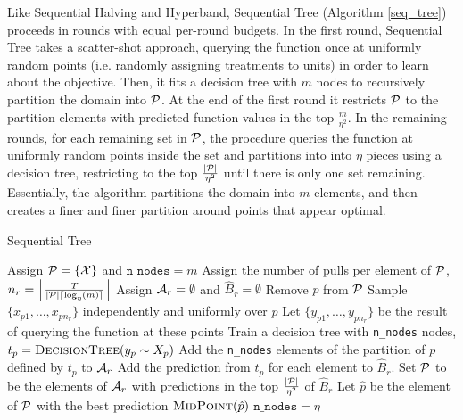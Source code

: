 \documentclass[11pt]{article}
\begin{document}
Like Sequential Halving and Hyperband, Sequential Tree (Algorithm \ref{seq_tree}) proceeds in rounds with equal per-round budgets. In the first round, Sequential Tree takes a scatter-shot approach, querying the function once at uniformly random points (i.e. randomly assigning treatments to units) in order to learn about the objective. Then, it fits a decision tree with $m$ nodes to recursively partition the domain into $\mathcal{P}$. At the end of the first round it restricts $\mathcal{P}$ to the partition elements with predicted function values in the top $\frac{m}{\eta^2}$. In the remaining rounds, for each remaining set in $\mathcal{P}$, the procedure queries the function at uniformly random points inside the set and partitions into into $\eta$ pieces using a decision tree, restricting to the top $\frac{|\mathcal{P}|}{\eta^2}$ until there is only one set remaining. Essentially, the algorithm partitions the domain into $m$ elements, and then creates a finer and finer partition around points that appear optimal.

\begin{algorithm}
\scriptsize
\caption{Sequential Tree}
\label{seq_tree}
\begin{algorithmic}[1]
\State Assign $\mathcal{P} = \{\mathcal{X}\}$ and $\texttt{n\_nodes} = m$
\State Assign the number of pulls per element of $\mathcal{P}$, $n_r = \left \lfloor \frac{T}{|\mathcal{P}| \lceil \log_\eta(m) \rceil} \right \rfloor$
\State Assign $\mathcal{A}_r = \emptyset$ and $\hat{B}_r = \emptyset$
\State Remove $p$ from $\mathcal{P}$
\State Sample $\{x_{p1},\ldots, x_{pn_r}\}$ independently and uniformly over $p$
\State Let $\{y_{p1},\ldots, y_{pn_r}\}$ be the result of querying the function at these points
\State Train a decision tree with \texttt{n\_nodes} nodes, $t_p = \textproc{DecisionTree}(y_p \sim X_p)$
\State Add the \texttt{n\_nodes} elements of the partition of $p$ defined by $t_p$ to $\mathcal{A}_r$
\State Add the prediction from $t_p$ for each element to $\hat{B}_r$.
\EndFor
{}
\State Set $\mathcal{P}$ to be the elements of $\mathcal{A}_r$ with predictions in the top $\frac{|\mathcal{P}|}{\eta^2}$ of $\hat{B}_r$
\Else 
\State Let $\hat{p}$ be the element of $\mathcal{P}$ with the best prediction
\State \Return $\textproc{MidPoint}(\hat{p})$
\EndIf
\State $\texttt{n\_nodes} = \eta$
\EndFor

\EndProcedure
\end{algorithmic}

\end{algorithm}
\end{document}
